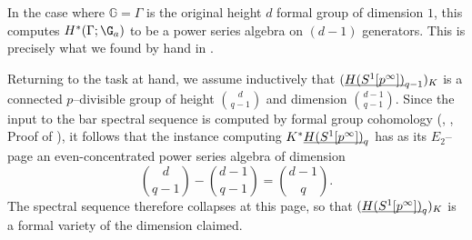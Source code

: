 \begin{remark}
In the case where \(\mathbb G = \Gamma\) is the original height \(d\) formal group of dimension \(1\), this computes \(H^*(\Gamma; \G_a)\) to be a power series algebra on \((d-1)\) generators.  This is precisely what we found by hand in .
\end{remark}

\noindent Returning to the task at hand, we assume inductively that \((\OS{H(S^1[p^\infty])}{q-1})_K\) is a connected \(p\)--divisible group of height \(\binom{d}{q-1}\) and dimension \(\binom{d-1}{q-1}\).  Since the input to the bar spectral sequence is computed by formal group cohomology (\cite{LazarevDeformations}, \cite[Example 2.3.5]{HopkinsLurie}, Proof of ), it follows that the instance computing \(K^* \OS{H(S^1[p^\infty])}{q}\) has as its \(E_2\)--page an even-concentrated power series algebra of dimension \[\binom{d}{q-1} - \binom{d-1}{q-1} = \binom{d-1}{q}.\]  The spectral sequence therefore collapses at this page, so that \((\OS{H(S^1[p^\infty])}{q})_K\) is a formal variety of the dimension claimed.

